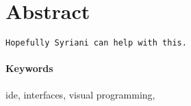 \section{Abstract}
\label{sec:abstract}

\begin{verbatim}
Hopefully Syriani can help with this.
\end{verbatim}


\paragraph{Keywords} \acl{ide}, interfaces, visual programming,
\textellipsis{}
